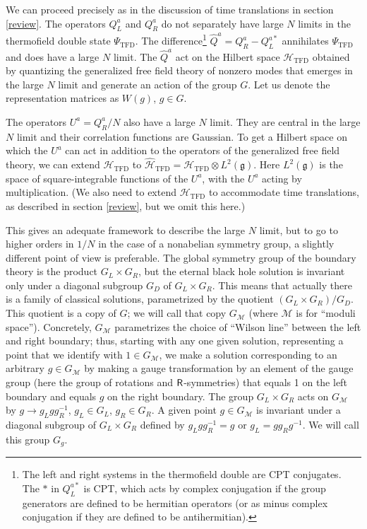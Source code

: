 \documentclass[11pt,a4paper]{article}
\def\g{{\mathfrak g}}
\def\h{\widehat}
\def\U{{ U}}
\def\h{\widehat}
\def\M{{\mathcal M}}
\def\H{{\mathcal H}}
\def\TFD{{\mathrm{TFD}}}
\def\Rr{{\sf R}}
\begin{document}
We can proceed precisely as in the discussion of time translations in section \ref{review}.  The operators $Q^a_L$ and $Q^a_R$ do not separately have
large $N$ limits in the thermofield double state $\Psi_\TFD$.   The difference\footnote{The left and right systems in the thermofield double
are CPT conjugates.  The $*$ in $Q_L^{a*}$ is CPT, which acts by complex conjugation if the group generators are defined to be hermitian
operators (or as minus complex conjugation if they are defined to be antihermitian).}    $\h Q^a=Q_R^a-Q_L^{a*}$ annihilates $\Psi_\TFD$ and does have a large $N$
limit.   The $\h Q^a$  act on the Hilbert space $\H_\TFD$ obtained by quantizing the generalized free field theory of nonzero modes that emerges in the large $N$ limit
\cite{LL,LL2} and  generate an action of the group $G$.  Let us denote the representation matrices as $W(g)$, $g\in G$.



The operators $\U^a=Q^a_R/N$
also have a large $N$ limit.   They are central in the large $N$ limit and their correlation functions are Gaussian.  To get a Hilbert space on which the $\U^a$
can act in addition to the operators of the generalized free field theory, we can extend $\H_\TFD$ to $\h\H_\TFD=\H_\TFD\otimes L^2(\g)$.  Here $L^2(\g)$ is the space
of square-integrable functions of the $\U^a$, with the $\U^a$ acting by multiplication.  (We also need to extend $\H_\TFD$ to accommodate time translations,
as described in section \ref{review}, but we omit this here.)     

This gives an adequate framework to describe the large $N$ limit, but to go to higher orders in $1/N$ in the case of a nonabelian symmetry group,
a slightly different point of view is preferable.  The global symmetry group of the boundary theory is the product $G_L\times G_R$, but the eternal black hole
solution is invariant only under a diagonal subgroup $G_D$ of $G_L\times G_R$.   This means that actually there is a family of classical solutions,
parametrized by the quotient $(G_L\times G_R)/G_D$.   This quotient is a copy of $G$; we will call that copy $G_\M$ (where $\M$ is for ``moduli space'').
Concretely, $G_\M$ parametrizes the choice of ``Wilson line'' between the left and right boundary; thus, starting with any one given solution, representing
a point that we identify with $1\in G_\M$, we make a solution corresponding to an arbitrary $g\in G_\M$ by making a gauge transformation by an element
of the gauge group (here the group of rotations and $\Rr$-symmetries) that equals 1 on the left boundary and equals $g$ on the right boundary.
The group $G_L\times G_R$ acts on $G_\M$ by $g\to g_L g g_R^{-1}$, $g_L\in G_L$, $g_R\in G_R$.   A given point $g\in G_\M$ is invariant under a
diagonal subgroup of $G_L\times G_R$ defined by $g_L g g_R^{-1}=g$ or $g_L=g g_R g^{-1}$.   We will call this group $G_g$.   
\end{document}
